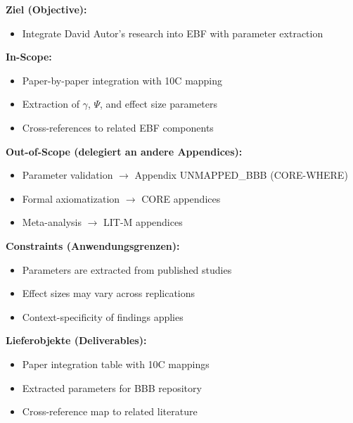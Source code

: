 
\begin{tcolorbox}[
    colback=orange!5!white,
    colframe=orange!75!black,
    title={\textbf{Appendix Scope: Ziel / In-Scope / Out-of-Scope / Constraints}},
    fonttitle=\bfseries
]

\textbf{Ziel (Objective):}
\begin{itemize}[nosep]
    \item Integrate David Autor's research into EBF with parameter extraction
\end{itemize}

\textbf{In-Scope:}
\begin{itemize}[nosep]
    \item Paper-by-paper integration with 10C mapping
    \item Extraction of $\gamma$, $\Psi$, and effect size parameters
    \item Cross-references to related EBF components
\end{itemize}

\textbf{Out-of-Scope (delegiert an andere Appendices):}
\begin{itemize}[nosep]
    \item Parameter validation $\rightarrow$ Appendix UNMAPPED_BBB (CORE-WHERE)
    \item Formal axiomatization $\rightarrow$ CORE appendices
    \item Meta-analysis $\rightarrow$ LIT-M appendices
\end{itemize}

\textbf{Constraints (Anwendungsgrenzen):}
\begin{itemize}[nosep]
    \item Parameters are extracted from published studies
    \item Effect sizes may vary across replications
    \item Context-specificity of findings applies
\end{itemize}

\textbf{Lieferobjekte (Deliverables):}
\begin{itemize}[nosep]
    \item Paper integration table with 10C mappings
    \item Extracted parameters for BBB repository
    \item Cross-reference map to related literature
\end{itemize}

\end{tcolorbox}

